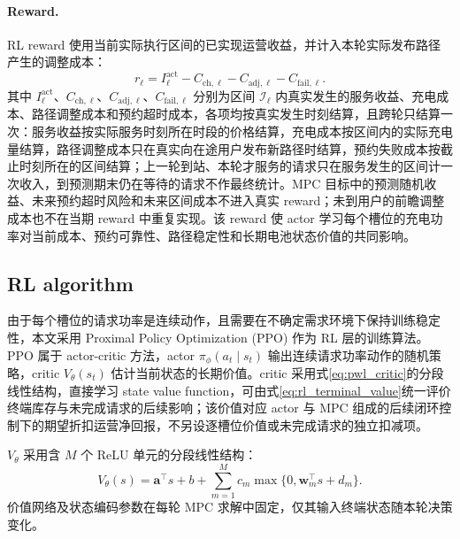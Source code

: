 \documentclass[12pt,a4paper,UTF8]{ctexart}
\begin{document}
\paragraph{Reward.}
RL reward 使用当前实际执行区间的已实现运营收益，并计入本轮实际发布路径产生的调整成本：
\begin{equation}
r_\ell
=
I_\ell^{\mathrm{act}}
-C_{\mathrm{ch},\ell}
-C_{\mathrm{adj},\ell}
-C_{\mathrm{fail},\ell}.
\label{eq:rl_reward}
\end{equation}
其中 $I_\ell^{\mathrm{act}}$、$C_{\mathrm{ch},\ell}$、$C_{\mathrm{adj},\ell}$、$C_{\mathrm{fail},\ell}$ 分别为区间 $\mathcal I_\ell$ 内真实发生的服务收益、充电成本、路径调整成本和预约超时成本，各项均按真实发生时刻结算，且跨轮只结算一次：服务收益按实际服务时刻所在时段的价格结算，充电成本按区间内的实际充电量结算，路径调整成本只在真实向在途用户发布新路径时结算，预约失败成本按截止时刻所在的区间结算；上一轮到站、本轮才服务的请求只在服务发生的区间计一次收入，到预测期末仍在等待的请求不作最终统计。MPC 目标中的预测随机收益、未来预约超时风险和未来区间成本不进入真实 reward；未到用户的前瞻调整成本也不在当期 reward 中重复实现。该 reward 使 actor 学习每个槽位的充电功率对当前成本、预约可靠性、路径稳定性和长期电池状态价值的共同影响。


\subsection{RL algorithm}

由于每个槽位的请求功率是连续动作，且需要在不确定需求环境下保持训练稳定性，本文采用 Proximal Policy Optimization (PPO) 作为 RL 层的训练算法。PPO 属于 actor-critic 方法，actor $\pi_{\phi}(a_t\mid s_t)$ 输出连续请求功率动作的随机策略，critic $V_{\theta}(s_t)$ 估计当前状态的长期价值。critic 采用式\eqref{eq:pwl_critic}的分段线性结构，直接学习 state value function，可由式\eqref{eq:rl_terminal_value}统一评价终端库存与未完成请求的后续影响；该价值对应 actor 与 MPC 组成的后续闭环控制下的期望折扣运营净回报，不另设逐槽位价值或未完成请求的独立扣减项。

$V_\theta$ 采用含 $M$ 个 ReLU 单元的分段线性结构：
\begin{equation}
V_\theta(s)
=\boldsymbol a^\top s+b
+\sum_{m=1}^{M}c_m
\max\{0,\boldsymbol w_m^\top s+d_m\}.
\label{eq:pwl_critic}
\end{equation}
价值网络及状态编码参数在每轮 MPC 求解中固定，仅其输入终端状态随本轮决策变化。
\end{document}
